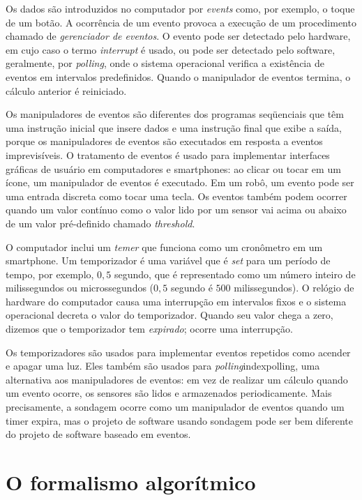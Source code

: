 Os dados são introduzidos no computador por \emph{events} como, por exemplo, o toque de um botão. A ocorrência de um evento provoca a execução de um procedimento chamado de \emph{gerenciador de eventos}. O evento pode ser detectado pelo hardware, em cujo caso o termo \emph{interrupt} é usado, ou pode ser detectado pelo software, geralmente, por \emph{polling}, onde o sistema operacional verifica a existência de eventos em intervalos predefinidos. Quando o manipulador de eventos termina, o cálculo anterior é reiniciado.

Os manipuladores de eventos são diferentes dos programas seqüenciais que têm uma instrução inicial que insere dados e uma instrução final que exibe a saída, porque os manipuladores de eventos são executados em resposta a eventos imprevisíveis. O tratamento de eventos é usado para implementar interfaces gráficas de usuário em computadores e smartphones: ao clicar ou tocar em um ícone, um manipulador de eventos é executado. Em um robô, um evento pode ser uma entrada discreta como tocar uma tecla. Os eventos também podem ocorrer quando um valor contínuo como o valor lido por um sensor vai acima ou abaixo de um valor pré-definido chamado \emph{threshold}.

O computador inclui um \emph{temer} que funciona como um cronômetro em um smartphone. Um temporizador é uma variável que é \emph{set} para um período de tempo, por exemplo, $0,5$ segundo, que é representado como um número inteiro de milissegundos ou microssegundos ($0,5$ segundo é $500$ milissegundos). O relógio de hardware do computador causa uma interrupção em intervalos fixos e o sistema operacional decreta o valor do temporizador. Quando seu valor chega a zero, dizemos que o temporizador tem \emph{expirado}; ocorre uma interrupção.

Os temporizadores são usados para implementar eventos repetidos como acender e apagar uma luz. Eles também são usados para \emph{polling}index{polling}, uma alternativa aos manipuladores de eventos: em vez de realizar um cálculo quando um evento ocorre, os sensores são lidos e armazenados periodicamente. Mais precisamente, a sondagem ocorre como um manipulador de eventos quando um timer expira, mas o projeto de software usando sondagem pode ser bem diferente do projeto de software baseado em eventos.

\section{O formalismo algorítmico}\label{s.alg-formalism}

